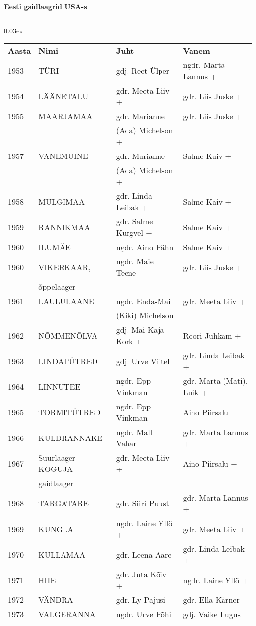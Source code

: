 \documentclass[10pt]{book}
\begin{document}
\centerline{ {\bf {\large Eesti  gaidlaagrid  USA-s}}}
\vspace{0.1in}
\hrule height 0.05ex
{\centering\scriptsize\arrayrulewidth 0.03ex
\begin{tabular*}{1.0\textwidth}{@{\extracolsep{\fill}}@{}l@{}@{}l@{}@{}l@{}@{}l@{}}
\bf{Aasta}	&	\bf{Nimi}				&	\bf{Juht}				&	\bf{Vanem}\\[2mm]
	1953	&	T\"URI					&	gdj. Reet \"Ulper		&	ngdr. Marta Lannus +\\[2mm]
	1954	&	L\"A\"ANETALU			&	gdr. Meeta Liiv +		&	gdr. Liis Juske +\\[2mm]
	1955	&	MAARJAMAA				&	gdr. Marianne 			&	gdr. Liis Juske +\\
			&							&	(Ada) Michelson +		&	\\[2mm]
	1957	&	VANEMUINE				&	gdr. Marianne 		 	&	Salme Kaiv +\\
			&							&	(Ada) Michelson +		&	\\[2mm]
	1958	&	MULGIMAA				&	gdr. Linda Leibak +		&	Salme Kaiv +\\[2mm]
	1959	&	RANNIKMAA				&	gdr. Salme Kurgvel +	&	Salme Kaiv +\\[2mm]
	1960	&	ILUM\"AE				&	ngdr. Aino P\"ahn		&	Salme Kaiv +\\[2mm]
	1960	&	VIKERKAAR, 				&	ngdr. Maie Teene		&	gdr. Liis Juske +\\
			&	\~oppelaager			&							&	\\[2mm]
	1961	&	LAULULAANE				&	ngdr. Enda-Mai 			&	gdr. Meeta Liiv +\\
			&							&	(Kiki) Michelson		&	\\[2mm]
	1962	&	N\~OMMEN\~OLVA			&	gdj. Mai Kaja Kork +	&	Roori Juhkam +\\[2mm]
	1963	&	LINDAT\"UTRED			&	gdj. Urve Viitel		&	gdr. Linda Leibak +\\[2mm]
	1964	&	LINNUTEE				&	ngdr. Epp Vinkman		&	gdr. Marta (Mati). Luik +\\[2mm]
	1965	&	TORMIT\"UTRED			&	ngdr. Epp Vinkman		&	Aino Piirsalu +\\[2mm]
	1966	&	KULDRANNAKE				&	ngdr. Mall Vahar		&	gdr. Marta Lannus +\\[2mm]
	1967	&	Suurlaager KOGUJA		&	gdr. Meeta Liiv +		&	Aino Piirsalu +\\
			&	gaidlaager				&							&	\\[2mm]
	1968	&	TARGATARE				&	gdr. Siiri Puust		&	gdr. Marta Lannus + \\[2mm]
	1969	&	KUNGLA					&	ngdr. Laine Yll\"o +	&	gdr. Meeta Liiv +\\[2mm]
	1970	&	KULLAMAA				&	gdr. Leena Aare			&	gdr. Linda Leibak +\\[2mm]
	1971	&	HIIE					&	gdr. Juta K\~oiv +		&	ngdr. Laine Yll\"o +\\[2mm]
	1972	&	V\"ANDRA				&	gdr. Ly Pajusi			&	gdr. Ella K\"arner\\[2mm]
	1973	&	VALGERANNA				&	ngdr. Urve P\~ohi		&	gdj. Vaike Lugus\\[2mm]
\end{tabular*}}
\end{document}
